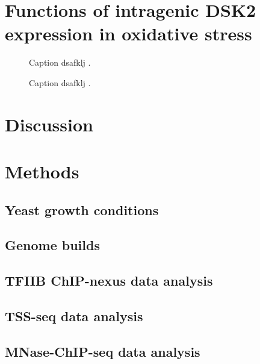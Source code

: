 \section{Functions of intragenic DSK2 expression in oxidative stress}

\lipsum[1]

\begin{figure}
\caption[A figure showing TSS-seq, TFIIB ChIP-nexus, and MNase-ChIP-seq at DSK2.]{Caption dsafklj .}
\end{figure}

\begin{figure}
\caption[A figure showing DSK2 fitness competition results.]{Caption dsafklj .}
\end{figure}

\section{Discussion}

\lipsum[1]

\section{Methods}

\subsection{Yeast growth conditions}

\subsection{Genome builds}

\subsection{TFIIB ChIP-nexus data analysis}

\subsection{TSS-seq data analysis}

\subsection{MNase-ChIP-seq data analysis}

